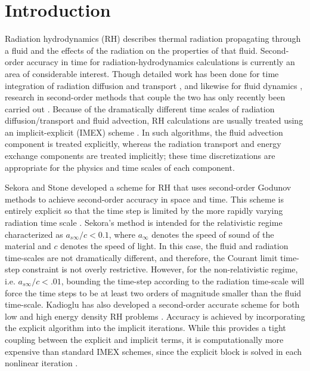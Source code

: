 \documentclass[preprint,12pt]{elsarticle}
\begin{document}
\section{Introduction}
\label{sec:Introduction}

Radiation hydrodynamics (RH) describes thermal radiation propagating through a fluid and the effects of the radiation on the properties of that fluid.  
Second-order accuracy in time for radiation-hydrodynamics calculations is currently an area of considerable interest.  Though detailed work has been 
done for time integration of radiation diffusion and transport \cite{mcclarren,lowrie2,knoll,olson,axelrod,stone,brown}, and likewise for fluid 
dynamics \cite{toro}, research in second-order methods that couple the two has only recently been carried out \cite{lowrie,bates,dai}.  Because of the 
dramatically different time scales of radiation diffusion/transport and fluid advection, RH calculations are usually treated using an implicit-explicit 
(IMEX) scheme \cite{lowrie, bates,dai}.  In such algorithms, the fluid advection component is treated explicitly, whereas the radiation transport and energy exchange
components are treated implicitly; these time discretizations are appropriate for the
physics and time scales of each component.

Sekora and Stone developed a scheme for RH that uses second-order Godunov methods to achieve second-order accuracy in space and time.  This scheme is 
entirely explicit so that the time step is limited by the more rapidly varying radiation time scale \cite{sekora}.  Sekora's method is intended for the 
relativistic regime characterized as $a_{s\infty}/c < 0.1$, where $a_{\infty}$ denotes the speed of sound of the material and $c$ denotes the speed of light.  In this case, 
the fluid and radiation time-scales are not dramatically different, and therefore, the Courant limit time-step constraint is not overly restrictive.  
However, for the non-relativistic regime, i.e. $a_{s\infty}/c < .01$, bounding the time-step according to the radiation time-scale will force the time steps 
to be at least two orders of magnitude smaller than the fluid time-scale.  Kadioglu has also developed a second-order accurate scheme for both low and 
high energy density RH problems \cite{kadioglu,kadioglu2}.  Accuracy is achieved by incorporating the explicit algorithm into the implicit iterations. 
While this provides a tight coupling between the explicit and implicit terms, it is computationally more expensive than standard IMEX schemes, since the 
explicit block is solved in each nonlinear iteration \cite{kadioglu}.
\end{document}
